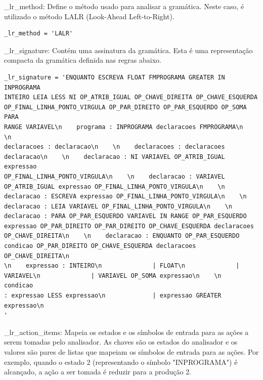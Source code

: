 \documentclass[a4paper,12pt]{article}
\begin{document}
\_lr\_method: Define o método usado para analisar a gramática. Neste 
caso, é utilizado o método LALR (Look-Ahead Left-to-Right).
\begin{Verbatim}
_lr_method = 'LALR'
\end{Verbatim}

\_lr\_signature: Contém uma assinatura da gramática. Esta é uma 
representação compacta da gramática definida nas regras abaixo.
\begin{Verbatim}
_lr_signature = 'ENQUANTO ESCREVA FLOAT FMPROGRAMA GREATER IN INPROGRAMA 
INTEIRO LEIA LESS NI OP_ATRIB_IGUAL OP_CHAVE_DIREITA OP_CHAVE_ESQUERDA 
OP_FINAL_LINHA_PONTO_VIRGULA OP_PAR_DIREITO OP_PAR_ESQUERDO OP_SOMA PARA 
RANGE VARIAVEL\n    programa : INPROGRAMA declaracoes FMPROGRAMA\n    \n 
declaracoes : declaracao\n    \n    declaracoes : declaracoes 
declaracao\n    \n    declaracao : NI VARIAVEL OP_ATRIB_IGUAL expressao 
OP_FINAL_LINHA_PONTO_VIRGULA\n    \n    declaracao : VARIAVEL 
OP_ATRIB_IGUAL expressao OP_FINAL_LINHA_PONTO_VIRGULA\n    \n    
declaracao : ESCREVA expressao OP_FINAL_LINHA_PONTO_VIRGULA\n    \n    
declaracao : LEIA VARIAVEL OP_FINAL_LINHA_PONTO_VIRGULA\n    \n    
declaracao : PARA OP_PAR_ESQUERDO VARIAVEL IN RANGE OP_PAR_ESQUERDO 
expressao OP_PAR_DIREITO OP_PAR_DIREITO OP_CHAVE_ESQUERDA declaracoes 
OP_CHAVE_DIREITA\n    \n    declaracao : ENQUANTO OP_PAR_ESQUERDO 
condicao OP_PAR_DIREITO OP_CHAVE_ESQUERDA declaracoes OP_CHAVE_DIREITA\n 
\n    expressao : INTEIRO\n              | FLOAT\n              | 
VARIAVEL\n              | VARIAVEL OP_SOMA expressao\n    \n    condicao 
: expressao LESS expressao\n             | expressao GREATER expressao\n 
'
\end{Verbatim}

\_lr\_action\_items: Mapeia os estados e os símbolos de entrada para as 
ações a serem tomadas pelo analisador. As chaves são os estados do 
analisador e os valores são pares de listas que mapeiam os símbolos de 
entrada para as ações. Por exemplo, quando o estado 2 (representando o 
símbolo "INPROGRAMA") é alcançado, a ação a ser tomada é reduzir para a 
produção 2.
\end{document}
